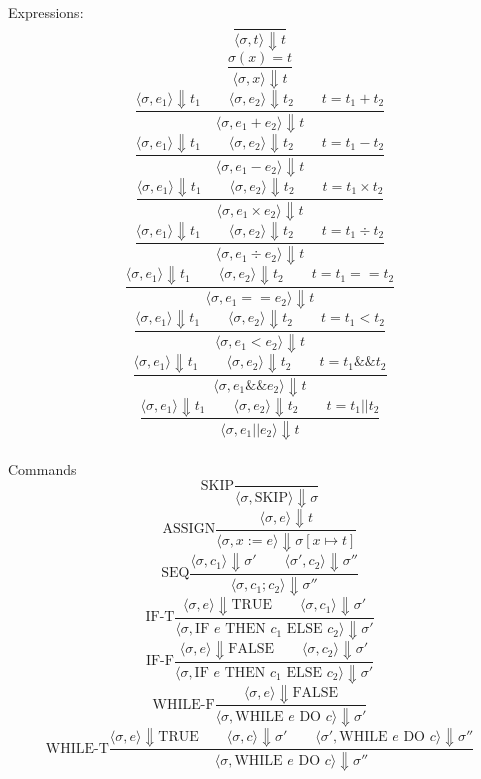 \documentclass[10pt,twocolumn]{article}
\begin{document}
 Expressions:\\
\[
	\frac{}{\langle \sigma, t \rangle \Downarrow t}
\]
\[
	\frac{\sigma(x) = t}{\langle \sigma, x \rangle \Downarrow t}
\]
\[
	\frac{\langle \sigma, e_1 \rangle \Downarrow t_1 \qquad \langle \sigma, e_2 \rangle \Downarrow t_2 \qquad t = t_1 + t_2}{\langle \sigma, e_1 + e_2 \rangle \Downarrow t}
\]
\[
	\frac{\langle \sigma, e_1 \rangle \Downarrow t_1 \qquad \langle \sigma, e_2 \rangle \Downarrow t_2 \qquad t = t_1 - t_2}{\langle \sigma, e_1 - e_2 \rangle \Downarrow t}
\]
\[
	\frac{\langle \sigma, e_1 \rangle \Downarrow t_1 \qquad \langle \sigma, e_2 \rangle \Downarrow t_2 \qquad t = t_1 \times t_2}{\langle \sigma, e_1 \times e_2 \rangle \Downarrow t}
\]
\[
	\frac{\langle \sigma, e_1 \rangle \Downarrow t_1 \qquad \langle \sigma, e_2 \rangle \Downarrow t_2 \qquad t = t_1 \div t_2}{\langle \sigma, e_1 \div e_2 \rangle \Downarrow t}
\]
\[
	\frac{\langle \sigma, e_1 \rangle \Downarrow t_1 \qquad \langle \sigma, e_2 \rangle \Downarrow t_2 \qquad t = t_1 == t_2}{\langle \sigma, e_1 == e_2 \rangle \Downarrow t}
\]
\[
	\frac{\langle \sigma, e_1 \rangle \Downarrow t_1 \qquad \langle \sigma, e_2 \rangle \Downarrow t_2 \qquad t = t_1 < t_2}{\langle \sigma, e_1 < e_2 \rangle \Downarrow t}
\]
\[
	\frac{\langle \sigma, e_1 \rangle \Downarrow t_1 \qquad \langle \sigma, e_2 \rangle \Downarrow t_2 \qquad t = t_1 \&\& t_2}{\langle \sigma, e_1 \&\& e_2 \rangle \Downarrow t}
\]
\[
	\frac{\langle \sigma, e_1 \rangle \Downarrow t_1 \qquad \langle \sigma, e_2 \rangle \Downarrow t_2 \qquad t = t_1 || t_2}{\langle \sigma, e_1 || e_2 \rangle \Downarrow t}
\]\\
Commands\\
\[
	\text{SKIP} \frac{}{\langle \sigma, \text{SKIP} \rangle \Downarrow \sigma}
\]
\[
	\text{ASSIGN} \frac{\langle \sigma, e \rangle \Downarrow t}{\langle \sigma, x := e \rangle \Downarrow \sigma[x \mapsto t]}
\]
\[
	\text{SEQ} \frac{\langle \sigma, c_1 \rangle \Downarrow \sigma' \qquad \langle \sigma', c_2 \rangle \Downarrow \sigma''}{\langle \sigma, c_1; c_2 \rangle \Downarrow \sigma''}
\]
\[
	\text{IF-T} \frac{\langle \sigma, e \rangle \Downarrow \text{TRUE} \qquad \langle \sigma, c_1 \rangle \Downarrow \sigma'}{\langle \sigma, \text{IF } e \text{ THEN } c_1 \text{ ELSE } c_2 \rangle \Downarrow \sigma'}
\]
\[
	\text{IF-F} \frac{\langle \sigma, e \rangle \Downarrow \text{FALSE} \qquad \langle \sigma, c_2 \rangle \Downarrow \sigma'}{\langle \sigma, \text{IF } e \text{ THEN } c_1 \text{ ELSE } c_2 \rangle \Downarrow \sigma'}
\]
\[
	\text{WHILE-F} \frac{\langle \sigma, e \rangle \Downarrow \text{FALSE}}{\langle \sigma, \text{WHILE } e \text{ DO } c \rangle \Downarrow \sigma'}
\]
\[
	\text{WHILE-T} \frac{\langle \sigma, e \rangle \Downarrow \text{TRUE} \qquad \langle \sigma, c \rangle \Downarrow \sigma' \qquad \langle \sigma', \text{WHILE } e \text{ DO } c \rangle \Downarrow \sigma''}{\langle \sigma, \text{WHILE } e \text{ DO } c \rangle \Downarrow \sigma''}
\]
\end{document}
